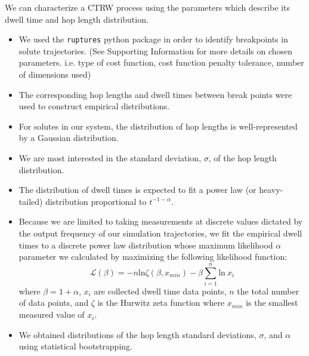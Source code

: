 \documentclass{article}
\begin{document}
  \noindent We can characterize a CTRW process using the parameters which describe its
  dwell time and hop length distribution.
  \begin{itemize}
	\item We used the \texttt{ruptures} python package in order to identify
	breakpoints in solute trajectories.\cite{truong_ruptures:_2018} (See Supporting Information for more
	details on chosen parameters. i.e. type of cost function, cost function penalty
	tolerance, number of dimensions used)
	\item The corresponding hop lengths and dwell times between break points were 
	used to construct empirical distributions.
	\item For solutes in our system, the distribution of hop lengths is
	well-represented by a Gaussian distribution.~\cite{metzler_random_2000,
	metzler_anomalous_2014,neusius_subdiffusion_2009}
	\item We are most interested in the standard deviation, $\sigma$, of the 
	hop length distribution.
	\item The distribution of dwell	times is expected to fit a power law (or heavy-tailed)
	distribution proportional to $t^{-1-\alpha}$.~\cite{meroz_toolbox_2015}
	\item Because we are limited to taking measurements at discrete values
	dictated by the output frequency of our simulation trajectories, we fit the
	empirical dwell times to a discrete power law distribution whose maximum
	likelihood $\alpha$ parameter we calculated by maximizing the following
	likelihood function: 
        \begin{equation}
	\mathcal{L}(\beta) = -n\text{ln}\zeta(\beta, x_{min}) -
	\beta\sum_{i=1}^{n} \text{ln}~x_i 
	\label{eqn:powerlaw_likelihood}
	\end{equation}
	where $\beta = 1 + \alpha$, $x_i$ are collected dwell time data points,
	$n$ the total number of data points, and $\zeta$ is the Hurwitz zeta function
	where $x_{min}$ is the smallest measured value of
	$x_i$.~\cite{clauset_power-law_2009} 
	\item We obtained distributions of the hop length standard deviations, $\sigma$, and
	$\alpha$ using statistical bootstrapping.\cite{efron_introduction_1994} 
  \end{itemize}
  
\end{document}
